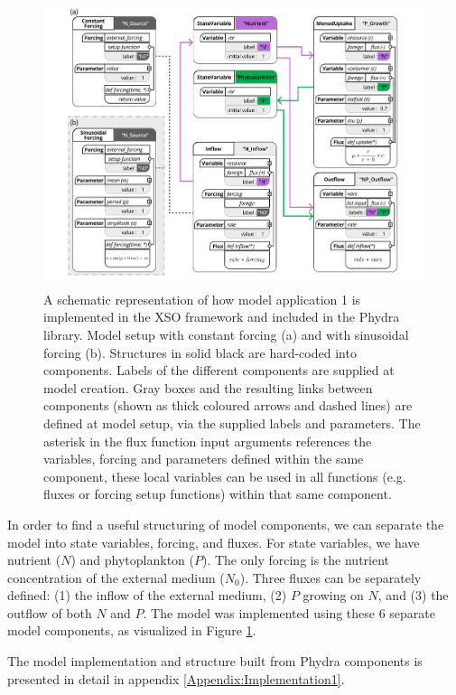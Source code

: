 \documentclass[journal abbreviation, manuscript]{copernicus}
\begin{document}
\begin{figure}[t]
\includegraphics[width=15cm]{Figures/firstdraft_schematics/code_schematics/Chemostat.pdf}
\caption{A schematic representation of how model application 1 is implemented in the XSO framework and included in the Phydra library. Model setup with constant forcing (a) and with sinusoidal forcing (b). Structures in solid black are hard-coded into components. Labels of the different components are supplied at model creation. Gray boxes and the resulting links between components (shown as thick coloured arrows and dashed lines) are defined at model setup, via the supplied labels and parameters. The asterisk in the flux function input arguments references the variables, forcing and parameters defined within the same component, these local variables can be used in all functions (e.g. fluxes or forcing setup functions) within that same component.}
\label{Figure:CodeSchematics_1}
\end{figure}

In order to find a useful structuring of model components, we can separate the model into state variables, forcing, and fluxes. For state variables, we have nutrient ($N$) and phytoplankton ($P$). The only forcing is the nutrient concentration of the external medium ($N_0$). Three fluxes can be separately defined: (1) the inflow of the external medium, (2) $P$ growing on $N$, and (3) the outflow of both $N$ and $P$.
The model was implemented using these 6 separate model components, as visualized in Figure \ref{Figure:CodeSchematics_1}.

The model implementation and structure built from Phydra components is presented in detail in appendix \ref{Appendix:Implementation1}.
\end{document}
